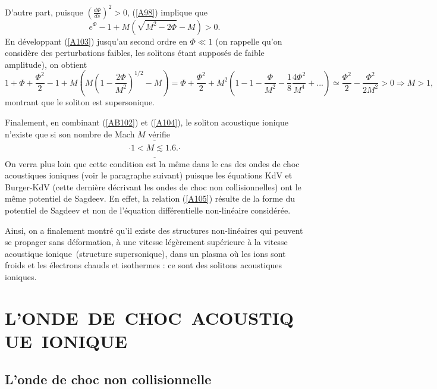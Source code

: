 \documentclass[10pt,thmsa]{article}
\begin{document}
D'autre part, puisque $\left(  \frac{d\Phi}{ds}\right)  ^{2}>0$, (\ref{A98})
implique que
\begin{equation}
e^{\Phi}-1+M(\sqrt{M^{2}-2\Phi}-M)>0.\label{A103}%
\end{equation}
En d\'{e}veloppant (\ref{A103}) jusqu'au second ordre en $\Phi\ll1$ (on
rappelle qu'on consid\`{e}re des perturbations faibles, les solitons \'{e}tant
suppos\'{e}s de faible amplitude), on obtient
\begin{equation}
1+\Phi+\frac{\Phi^{2}}{2}-1+M(M(1-\frac{2\Phi}{M^{2}})^{1/2}-M)=\Phi
+\frac{\Phi^{2}}{2}+M^{2}(1-1-\frac{\Phi}{M^{2}}-\frac{1}{8}\frac{4\Phi^{2}%
}{M^{4}}+...)\simeq\frac{\Phi^{2}}{2}-\frac{\Phi^{2}}{2M^{2}}>0\Rightarrow
M>1,\label{A104}%
\end{equation}
montrant que le soliton est supersonique.

Finalement, en combinant (\ref{AB102}) et (\ref{A104}), le soliton acoustique
ionique n'existe que si son nombre de Mach $M$ v\'{e}rifie
\begin{equation}
\overline{\underline{\frac{^{{}}}{{}}1<M\lesssim1.6.\frac{^{{}}}{{}}}%
}\label{A105}%
\end{equation}
On verra plus loin que cette condition est la m\^{e}me dans le cas des ondes
de choc acoustiques ioniques (voir le paragraphe suivant) puisque les
\'{e}quations KdV et Burger-KdV (cette derni\`{e}re d\'{e}crivant les ondes de
choc non collisionnelles) ont le m\^{e}me potentiel de Sagdeev. En effet, la
relation (\ref{A105}) r\'{e}sulte de la forme du potentiel de Sagdeev et non
de l'\'{e}quation diff\'{e}rentielle non-lin\'{e}aire consid\'{e}r\'{e}e.

Ainsi, on a finalement montr\'{e} qu'il existe des structures
non-lin\'{e}aires qui peuvent se propager sans d\'{e}formation, \`{a} une
vitesse l\'{e}g\`{e}rement sup\'{e}rieure \`{a} la vitesse acoustique
ionique\ (structure supersonique), dans un plasma o\`{u} les ions sont froids
et les \'{e}lectrons chauds et isothermes : ce sont des solitons acoustiques ioniques.%

\newpage


\section{L'ONDE\ DE\ CHOC\ ACOUSTIQUE\ IONIQUE}

\subsection{L'onde de choc non collisionnelle}
\end{document}
